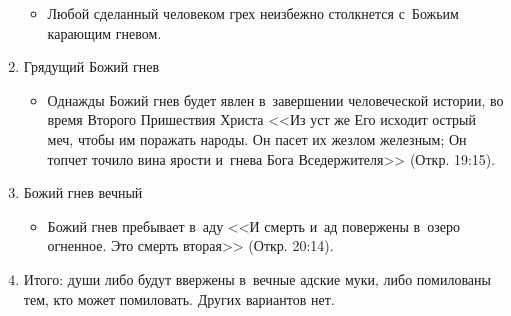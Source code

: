 \documentclass[a4paper,12pt]{article}
\begin{document}
\begin{enumerate}
\begin{itemize}
        \item Любой сделанный человеком грех неизбежно столкнется с~Божьим карающим гневом.
    \end{itemize}
    \item Грядущий Божий гнев 
    \begin{itemize}
        \item Однажды Божий гнев будет явлен в~завершении человеческой истории, во время Второго Пришествия Христа  <<Из уст же Его исходит острый меч, чтобы им поражать народы. Он пасет их жезлом железным; Он топчет точило вина ярости и~гнева Бога Вседержителя>> (Откр. 19:15). 
    \end{itemize}
    \item Божий гнев вечный 
    \begin{itemize}
        \item Божий гнев пребывает в~аду  <<И смерть и~ад повержены в~озеро огненное. Это смерть вторая>> (Откр. 20:14).
    \end{itemize}
    \item Итого: души либо будут ввержены в~вечные адские муки, либо помилованы тем, кто может помиловать. Других вариантов нет.
\end{enumerate}
\end{document}
